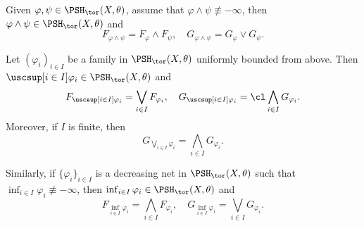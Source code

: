 \begin{proposition}\label{prop:toricrooftopbig}
    Given $\varphi,\psi\in \PSH_{\tor}(X,\theta)$, assume that $\varphi\land\psi\not\equiv -\infty$,
    then $\varphi\land \psi\in \PSH_{\tor}(X,\theta)$ and
    \[
    F_{\varphi\land \psi}=F_{\varphi}\land F_{\psi},\quad G_{\varphi\land \psi}=G_{\varphi}\lor G_{\psi}.
    \]
\end{proposition}
\begin{proposition}\label{prop:toricseqbig}
    Let $(\varphi_i)_{i\in I}$ be a family in $\PSH_{\tor}(X,\theta)$ uniformly bounded from above. Then $\uscsup[i\in I] \varphi_i\in \PSH_{\tor}(X,\theta)$ and
    \[
    F_{\uscsup[i\in I]\varphi_i}=\bigvee_{i\in I}F_{\varphi_i},\quad G_{\uscsup[i\in I]\varphi_i}=\cl \bigwedge_{i\in I} G_{\varphi_i}.
    \]
    Moreover, if $I$ is finite, then
    \[
        G_{\bigvee_{i\in I}\varphi_i}=\bigwedge_{i\in I} G_{\varphi_i}.
    \]

    Similarly, if $\{\varphi_i\}_{i\in I}$ is a decreasing net in $\PSH_{\tor}(X,\theta)$ such that $\inf_{i\in I}\varphi_i\not\equiv -\infty$, then $\inf_{i\in I}\varphi_i\in \PSH_{\tor}(X,\theta)$ and
    \[
    F_{\inf_{i\in I}\varphi_i}=\bigwedge_{i\in I}F_{\varphi_i},\quad G_{\inf_{i\in I}\varphi_i}=\bigvee_{i\in I}G_{\varphi_i}.
    \]
\end{proposition}


